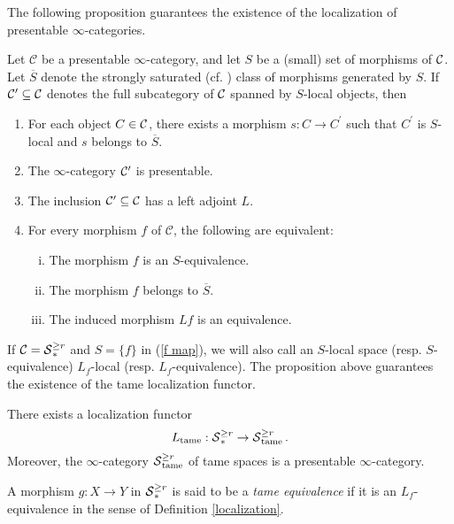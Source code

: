 The following proposition guarantees the existence of the localization of presentable $\infty$-categories.
\begin{proposition}
    \cite[Proposition 5.5.4.15.]{HTT}
    \label{Prop 5.5.4.15. HTT}
    Let $\mathcal{C}$ be a presentable $\infty$-category, and let $S$ be a (small) set of morphisms of ${\mathcal{C}}$. Let $\overline{S}$ denote the strongly saturated (cf. \cite[Definition 5.5.4.5.]{HTT}) class of morphisms generated by $S$. If $\mathcal{C}^{\prime} \subseteq {\mathcal{C}}$ denotes the full subcategory of ${\mathcal{C}}$ spanned by $S$-local objects, then
    \begin{enumerate}
        \item For each object $C \in {\mathcal{C}}$, there exists a morphism $s: C \rightarrow C^{\prime}$ such that $C^{\prime}$ is $S$-local and $s$ belongs to $\overline{S}$.
        \item The $\infty$-category ${\mathcal{C}}'$ is presentable.
        \item The inclusion ${\mathcal{C}}' \subseteq \mathcal{C}$ has a left adjoint $L$.
        \item For every morphism $f$ of $\mathcal{C}$, the following are equivalent:
        \begin{enumerate}[(i)]
            \item  The morphism $f$ is an $S$-equivalence.
            \item The morphism $f$ belongs to $\overline{S}$.
            \item The induced morphism $L f$ is an equivalence.
        \end{enumerate}
    \end{enumerate}
\end{proposition}
If ${\mathcal{C}} = \operatorname{\mathcal{S}}^{\geq r}_{*}$ and $S= \{f\}$ in (\ref{f map}), we will also call an $S$-local space (resp. $S$-equivalence) $L_f$-local (resp. $L_f$-equivalence).
The proposition above guarantees the existence of the tame localization functor. 
\begin{corollary}
\label{existence of tame localization}
There exists a localization functor
$$
L_{\operatorname{\operatorname{tame}}}: \operatorname{\mathcal{S}}^{\geq r}_* \to \operatorname{\mathcal{S}}^{\geq r}_{\operatorname{\operatorname{tame}}}.
$$
Moreover, the $\infty$-category $\operatorname{\mathcal{S}}^{\geq r}_{\operatorname{\operatorname{tame}}}$ of tame spaces is a presentable $\infty$-category.
\end{corollary}
\begin{definition}
    A morphism $g:X \to Y$ in $\operatorname{\mathcal{S}}^{\geq r}_*$ is said to be a \emph{tame equivalence} if it is an $L_f$-equivalence in the sense of Definition \ref{localization}.
\end{definition}

